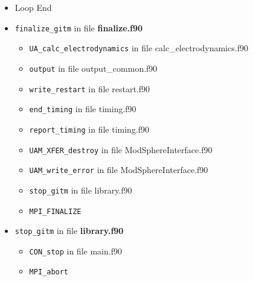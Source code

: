\begin{itemize}
 \item Loop End


\item {\tt finalize\_gitm}   in file {\bf finalize.f90}
  \begin{itemize}
    \item {\tt UA\_calc\_electrodynamics} in file calc\_electrodynamics.f90
    \item {\tt output} in file output\_common.f90
    \item {\tt write\_restart} in file restart.f90
    \item {\tt end\_timing} in file timing.f90
    \item {\tt report\_timing} in file timing.f90
    \item {\tt UAM\_XFER\_destroy} in file ModSphereInterface.f90
    \item {\tt UAM\_write\_error} in file ModSphereInterface.f90
    \item {\tt stop\_gitm} in file library.f90
    \item {\tt MPI\_FINALIZE}
  \end{itemize}


\item {\tt stop\_gitm}   in file {\bf library.f90}
  \begin{itemize}
    \item {\tt CON\_stop} in file main.f90
    \item {\tt MPI\_abort}
  \end{itemize}
\end{itemize}
